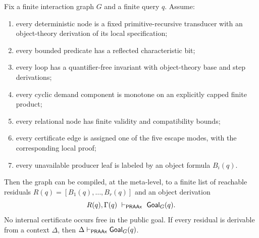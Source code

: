 \begin{theorem}
\label{thm:scope-normal-form}
Fix a finite interaction graph \(G\) and a finite query \(q\).  Assume:

\begin{enumerate}
\item every deterministic node is a fixed primitive-recursive transducer with an object-theory derivation of its local specification;
\item every bounded predicate has a reflected characteristic bit;
\item every loop has a quantifier-free invariant with object-theory base and step derivations;
\item every cyclic demand component is monotone on an explicitly capped finite product;
\item every relational node has finite validity and compatibility bounds;
\item every certificate edge is assigned one of the five escape modes, with the corresponding local proof;
\item every unavailable producer leaf is labeled by an object formula \(B_i(q)\).
\end{enumerate}

Then the graph can be compiled, at the meta-level, to a finite list of reachable residuals \(R(q)=[B_1(q),\ldots,B_r(q)]\) and an object derivation
\[
  R(q),\Gamma(q)\ \vdash_{\PRAAx}\ \Goal_G(q).
\]
No internal certificate occurs free in the public goal.  If every residual is derivable from a context \(\Delta\), then \(\Delta\vdash_{\mathsf{PRAAx}}\mathsf{Goal}_G(q)\).
\end{theorem}

